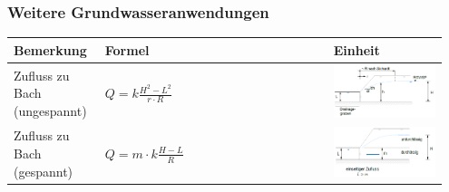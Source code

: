 \begin{minipage}{\linewidth}
	
	\subsubsection{Weitere Grundwasseranwendungen}
	
	\begin{tabular}{p{0.2\linewidth}|p{0.5\linewidth}|p{0.25\linewidth}}
		Bemerkung 		& Formel			&	Einheit \\ \hline
		
		Zufluss zu Bach (ungespannt) & $ Q = k \frac{H^2 - L^2}{r \cdot R} $	& \smallskip \includegraphics[width=\linewidth]{images/GW12Bachungespannt.PNG}  \\ \hline
		
		Zufluss zu Bach (gespannt)	& $ Q = m \cdot k \frac{H - L}{R} $ & \smallskip \includegraphics[width=\linewidth]{images/GW13Bachgespannt.PNG}  \\ \hline
		

\end{tabular}
\end{minipage}
